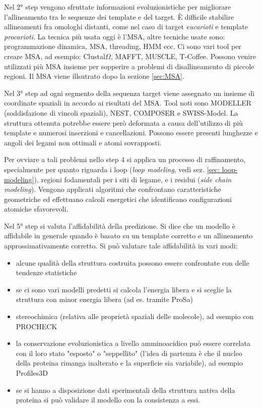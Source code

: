 {\par Nel 2° step vengono sfruttate informazioni evoluzionistiche per migliorare l'allineamento tra le sequenze dei template e del target. È difficile stabilire allineamenti fra omologhi distanti, come nel caso di target \textit{eucarioti} e template \textit{procarioti}. La tecnica più usata oggi è l'MSA, altre tecniche usate sono: programmazione dinamica, MSA, threading, HMM ecc. Ci sono vari tool per creare MSA, ad esempio: Clustal$\Omega$, MAFFT, MUSCLE, T-Coffee. Possono venire utilizzati più MSA insieme per sopperire a problemi di disallineamento di piccole regioni. Il MSA viene illsutrato dopo la sezione \ref{sec:MSA}.

\par Nel 3° step ad ogni segmento della sequenza target viene assegnato un insieme di coordinate spaziali in accordo ai risultati del MSA. Tool noti sono MODELLER (soddisfazione di vincoli spaziali), NEST, COMPOSER e SWISS-Model. La struttura ottenuta potrebbe essere però deformata a causa dell'utilizzo di più template e numerosi inserzioni e cancellazioni. Possono essere presenti lunghezze e angoli dei legami non ottimali e atomi sovrapposti.

\par Per ovviare a tali problemi nello step 4 si applica un processo di raffinamento, specialmente per quanto riguarda i loop (\textit{loop modeling}, vedi sez. \ref{sec: loop-modeling}), regioni fodamentali per i siti di legame, e i residui (\textit{side chain modeling}). Vengono applicati algoritmi che confrontano caratteristiche geometriche ed effettuano calcoli energetici che identificano configurazioni atomiche sfavorevoli. 

\par Nel 5° step si valuta l'affidabilità della predizione. Si dice che un modello è affidabile in generale quando è basato su un template corretto e un allineamento approssimativamente corretto. Si può valutare tale affidabilità in vari modi:

\begin{itemize}
	\item alcune qualità della struttura costruita possono essere confrontate con delle tendenze statistiche 
	\item se ci sono vari modelli predetti si calcola l'energia libera e si sceglie la struttura con minor energia libera (ad es. tramite ProSa)
	\item stereochimica (relativa alle proprietà spaziali delle molecole), ad esempio con PROCHECK
	\item la conservazione evoluzionistica a livello amminoacidico può essere correlata con il loro stato "esposto" o "seppellito" (l'idea di partenza è che il nucleo della proteina rimanga inalterato e la superficie sia variabile), ad esempio Profiles3D
	\item se si hanno a disposizione dati sperimentali della struttura nativa della proteina si può validare il modello con la consistenza a essi.
\end{itemize}

}

